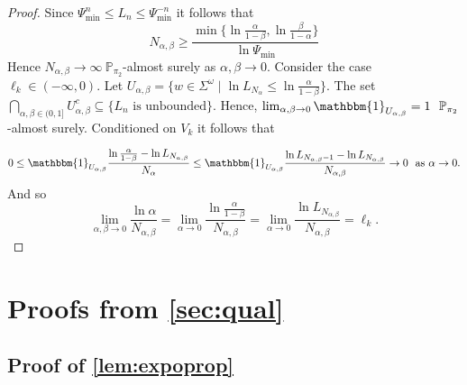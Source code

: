 \documentclass[a4paper,UKenglish,cleveref, autoref,mathscr]{lipics-v2019}
\newcommand{\PP}{\mathbb{P}}
\newcommand{\1}{\mathbbm{1}}
\newcommand{\Psimin}{\Psi_{\text{min}}}
\begin{document}
\begin{proof}
Since $\Psimin^n \leq L_n \leq \Psimin^{-n}$ it follows that
\begin{equation*}
N_{\alpha,\beta} \geq \frac{ \min \{ \ln \frac{\alpha}{1 - \beta}, \ln \frac{\beta}{1 - \alpha} \} }{\ln \Psimin}
\end{equation*}
Hence $N_{\alpha, \beta} \rightarrow \infty \ \PP_{\pi_2}$-almost surely as $\alpha, \beta \rightarrow 0$. Consider the case $\ell_k \in (-\infty, 0)$. Let $U_{\alpha,\beta} = \{w \in \Sigma^\omega \mid \ln L_{N_\alpha} \leq \ln \frac{ \alpha}{1 - \beta} \}$. The set $\bigcap_{\alpha, \beta \in (0,1]} U_{\alpha, \beta}^c \subseteq \{L_n \text{ is unbounded}\}$. Hence, $\lim_{\alpha, \beta \rightarrow 0}\1_{U_{\alpha,\beta}} = 1 \ ~\PP_{\pi_2}$-almost surely. Conditioned on $V_k$ it follows that

\begin{equation*}
0 \leq \1_{U_{\alpha, \beta}} \frac{\ln \frac{\alpha}{1 - \beta} - \ln L_{N_{\alpha, \beta}}}{N_\alpha} \leq \1_{U_{\alpha, \beta}}  \frac{\ln L_{N_{\alpha, \beta} - 1}  - \ln L_{N_{\alpha, \beta}}}{N_{\alpha, \beta}}\rightarrow 0 \ \text{ as } \alpha \rightarrow 0.
\end{equation*}
And so
\begin{equation*}
\lim_{\alpha, \beta \rightarrow 0}\frac{\ln \alpha}{N_{\alpha, \beta}} = \lim_{\alpha \rightarrow 0}\frac{\ln \frac{\alpha}{1-\beta}}{N_{\alpha, \beta}} =\lim_{\alpha \rightarrow 0}\frac{\ln L_{N_{\alpha, \beta}}}{N_{\alpha, \beta}} =\ell_k.
\end{equation*}
\end{proof}


\section{Proofs from \cref{sec:qual}} \label{app:qual}

\subsection{Proof of \cref{lem:expoprop}}
\end{document}
